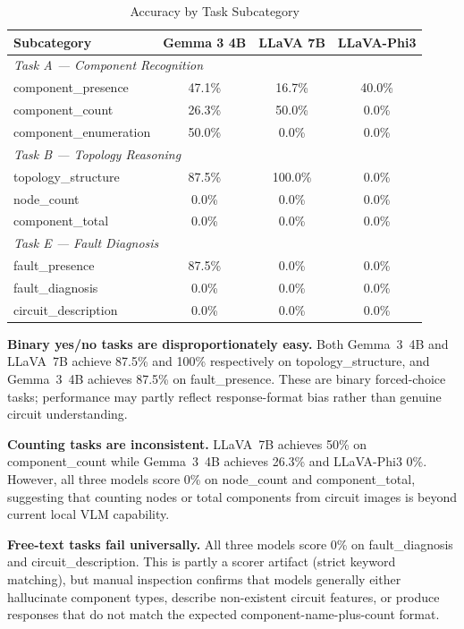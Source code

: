 \documentclass[conference]{IEEEtran}
\begin{document}
\begin{table}[t]
\centering
\caption{Accuracy by Task Subcategory}
\label{tab:subtask}
\begin{tabular}{lccc}
\toprule
\textbf{Subcategory} & \textbf{Gemma 3 4B} & \textbf{LLaVA 7B} & \textbf{LLaVA-Phi3} \\
\midrule
\multicolumn{4}{l}{\textit{Task A --- Component Recognition}} \\
component\_presence    & 47.1\% & 16.7\% & 40.0\% \\
component\_count       & 26.3\% & 50.0\% &  0.0\% \\
component\_enumeration & 50.0\% &  0.0\% &  0.0\% \\
\midrule
\multicolumn{4}{l}{\textit{Task B --- Topology Reasoning}} \\
topology\_structure    & 87.5\% &100.0\% &  0.0\% \\
node\_count            &  0.0\% &  0.0\% &  0.0\% \\
component\_total       &  0.0\% &  0.0\% &  0.0\% \\
\midrule
\multicolumn{4}{l}{\textit{Task E --- Fault Diagnosis}} \\
fault\_presence        & 87.5\% &  0.0\% &  0.0\% \\
fault\_diagnosis       &  0.0\% &  0.0\% &  0.0\% \\
circuit\_description   &  0.0\% &  0.0\% &  0.0\% \\
\bottomrule
\end{tabular}
\end{table}

\textbf{Binary yes/no tasks are disproportionately easy.}
Both Gemma~3~4B and LLaVA~7B achieve 87.5\% and 100\% respectively
on topology\_structure, and Gemma~3~4B achieves 87.5\% on
fault\_presence.
These are binary forced-choice tasks; performance may partly reflect
response-format bias rather than genuine circuit understanding.

\textbf{Counting tasks are inconsistent.}
LLaVA~7B achieves 50\% on component\_count while Gemma~3~4B achieves
26.3\% and LLaVA-Phi3 0\%.
However, all three models score 0\% on node\_count and
component\_total, suggesting that counting nodes or total components
from circuit images is beyond current local VLM capability.

\textbf{Free-text tasks fail universally.}
All three models score 0\% on fault\_diagnosis and circuit\_description.
This is partly a scorer artifact (strict keyword matching), but manual
inspection confirms that models generally either hallucinate component
types, describe non-existent circuit features, or produce responses
that do not match the expected component-name-plus-count format.
\end{document}
